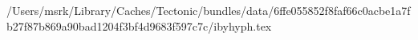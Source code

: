 /Users/msrk/Library/Caches/Tectonic/bundles/data/6ffe055852f8faf66c0acbe1a7fb27f87b869a90bad1204f3bf4d9683f597c7c/ibyhyph.tex